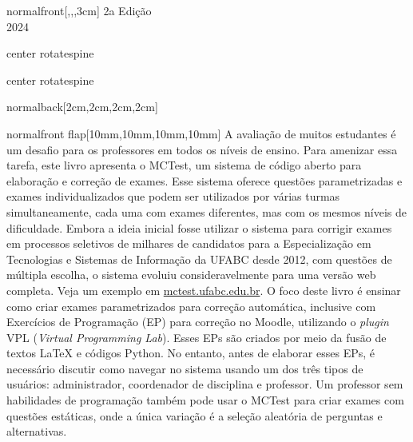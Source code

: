 \documentclass[
    coverwidth=21cm,  %
    coverheight=29.7cm, %
    spinewidth=12mm,  %
    ]{bookcover}
\begin{document}
\begin{bookcover}
\begin{bookcoverelement}{normal}{front}[,,,3cm]
{\centering
\color{green!30!black!80}\Large 2a Edição \\ 2024}

\end{bookcoverelement}


\begin{bookcoverelement}{center rotate}{spine}
    \color{yellow}\sffamily\bfseries
\end{bookcoverelement}

\begin{bookcoverelement}{center rotate}{spine}
    \color{yellow}\sffamily\bfseries
\end{bookcoverelement}

\begin{bookcoverelement}{normal}{back}[2cm,2cm,2cm,2cm]
    \color{white}%
\end{bookcoverelement}

\begin{bookcoverelement}{normal}{front flap}[10mm,10mm,10mm,10mm]
    \color{black}\large
A avaliação de muitos estudantes é um desafio para os professores em todos os níveis de ensino. Para ame\-nizar essa tarefa, este livro apresenta o MCTest, um sistema de código aberto para elaboração e correção de exa\-mes. Esse sistema oferece questões parametrizadas e exa\-mes indivi\-dualizados que podem ser utilizados por várias turmas simulta\-neamente, cada uma com exames diferentes, mas com os mesmos níveis de dificuldade.
%
Embora a ideia inicial fosse utilizar o sistema para corrigir exames em processos seletivos de mi\-lhares de candidatos para a Especia\-lização em Tecnologias e Sistemas de Informação da UFABC desde 2012, com questões de múltipla escolha, o sistema evoluiu considera\-velmente para uma versão web completa. Veja um exemplo em \url{mctest.ufabc.edu.br}.
%
O foco deste livro é ensinar como criar exames parametrizados para correção automática, inclusive com Exercícios de Programação (EP) para correção no Moodle, utilizando o \textit{plugin} VPL (\textit{Virtual Programming Lab}). Esses EPs são criados por meio da fusão de tex\-tos \LaTeX{} e códigos Python.
%
No entanto, antes de elaborar esses EPs, é necessário discutir como navegar no sistema usando um dos três tipos de usuários: administrador, coordenador de disciplina e professor. Um professor sem habilidades de programação também pode usar o MCTest para criar exames com questões estáticas, onde a única variação é a seleção aleatória de perguntas e alternativas. %
\end{bookcoverelement}


\end{bookcover}
\end{document}
